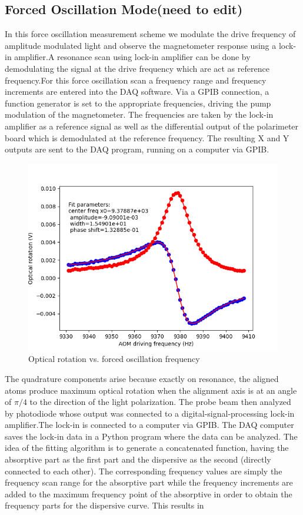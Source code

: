 \documentclass[12pt]{report}
\begin{document}
 \subsection{Forced Oscillation Mode(need to edit)}

 In this force oscillation measurement scheme we modulate the drive frequency of amplitude modulated light and  observe the magnetometer response using a lock-in amplifier.A resonance scan using lock-in amplifier can be done by demodulating the signal at the drive frequency which are act as reference frequency.For this force oscillation scan a frequency range and frequency increments are entered into the DAQ software. Via a
GPIB connection, a function generator is set to the appropriate frequencies, driving
the pump modulation of the magnetometer. The frequencies are taken by the lock-in
amplifier as a reference signal as well as the differential output of the polarimeter board
which is demodulated at the reference frequency. The resulting X and Y outputs are sent to the DAQ program, running on a computer via GPIB. 
\begin{figure}[h]
\centering\includegraphics[width=0.4\linewidth]{figures/FM_NMOR}
\caption{Optical rotation vs. forced oscillation frequency}
\end{figure}
The quadrature components arise because exactly on resonance, the aligned atoms produce maximum optical rotation when the alignment axis is at an angle of $ \pi/4$   to the direction of the light polarization.  
The probe beam then analyzed by photodiode whose output was connected to a digital-signal-processing lock-in amplifier.The lock-in is connected to a computer via GPIB. The DAQ computer saves the lock-in data in  a Python program where the data can be analyzed. The idea of the fitting algorithm is to generate a concatenated function, having the absorptive part as the first part and the dispersive as the second (directly connected to each other). The corresponding frequency values are simply the frequency scan range for the absorptive part while the frequency increments are added to the maximum frequency point of the absorptive in order to obtain the frequency parts for the dispersive curve. This results in
\end{document}
